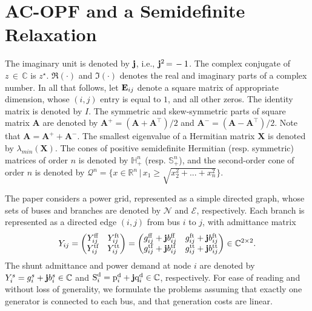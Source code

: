 \section{AC-OPF and a Semidefinite Relaxation}
\label{sec:formulation}

The imaginary unit is denoted by $\mathbf{j}$, i.e., $\mathbf{j}^{2} \, {=} \, -1$.
The complex conjugate of $z \, {\in} \, \mathbb{C}$ is $z^{\star}$.
$\Re(\cdot)$ and $\Im(\cdot)$ denotes the real and imaginary parts of a complex number.
In all that follows, let $\mathbf{E}_{ij}$ denote a square matrix of appropriate dimension, whose $(i, j)$ entry is equal to $1$, and all other zeros.
The identity matrix is denoted by $I$.
The symmetric and skew-symmetric parts of square matrix $\mathbf{A}$ are denoted by $\mathbf{A}^{+} = (\mathbf{A} + \mathbf{A}^{\top})/2$ and $\mathbf{A}^{-} = (\mathbf{A} - \mathbf{A}^{\top})/2$.
Note that $\mathbf{A} = \mathbf{A}^{+} + \mathbf{A}^{-}$.
The smallest eigenvalue of a Hermitian matrix $\mathbf{X}$ is denoted by $\lambda_{min}(\mathbf{X})$.
The cones of positive semidefinite Hermitian (resp. symmetric) matrices of order $n$ is denoted by $\mathbb{H}_{+}^{n}$ (resp. $\mathbb{S}^{n}_{+}$),
and the second-order cone of order $n$ is denoted by $\mathcal{Q}^{n} = \{x \in \mathbb{R}^{n} \, | \, x_{1} \geq \sqrt{x_{2}^{2} + ... + x_{n}^{2}} \}$.

The paper considers a power grid, represented as a simple directed graph, whose sets of buses and branches are denoted by $\mathcal{N}$ and $\mathcal{E}$, respectively.
Each branch is represented as a directed edge $(i, j)$ from bus $i$ to $j$, with admittance matrix
\begin{align}
    Y_{ij} =
    \begin{pmatrix}
        Y^{\text{ff}}_{ij} & Y^{\text{ft}}_{ij}\\
        Y^{\text{tf}}_{ij} & Y^{\text{tt}}_{ij}
    \end{pmatrix}
    = 
    \begin{pmatrix}
        g^{\text{ff}}_{ij} + \mathbf{j} b^{\text{ff}}_{ij} & g^{\text{ft}}_{ij} + \mathbf{j} b^{\text{ft}}_{ij}\\
        g^{\text{tf}}_{ij} + \mathbf{j} b^{\text{tf}}_{ij} & g^{\text{tt}}_{ij} + \mathbf{j} b^{\text{tt}}_{ij}
    \end{pmatrix}
    \in 
    \mathbb{C}^{2 \times 2}.
\end{align}
The shunt admittance and power demand at node $i$ are denoted by $Y^{s}_{i} = g^{s}_{i} + \mathbf{j} b^{s}_{i} \in \mathbb{C}$ and $\text{S}^{\text{d}}_{i} = \text{p}^{\text{d}}_{i} + \mathbf{j} \text{q}^{\text{d}}_{i} \in \mathbb{C}$, respectively.
For ease of reading and without loss of generality, we formulate the problems assuming that exactly one generator is connected to each bus, and that generation costs are linear.



